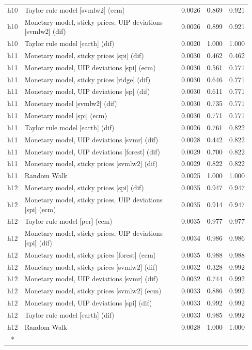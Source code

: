 \begin{ThreePartTable}
\begin{longtable}[t]{cp{5.5cm}ccc}
h10 & \raggedright Taylor rule model [svmlw2] (ecm) & 0.0026 & 0.869 & 0.921\\
h10 & \raggedright Monetary model, sticky prices, UIP deviations [svmlw2] (dif) & 0.0026 & 0.899 & 0.921\\
h10 & \raggedright Taylor rule model [earth] (dif) & 0.0020 & 1.000 & 1.000\\
\addlinespace
h11 & \raggedright Monetary model, sticky prices [spi] (dif) & 0.0030 & 0.462 & 0.462\\
h11 & \raggedright Monetary model, UIP deviations [spi] (ecm) & 0.0030 & 0.561 & 0.771\\
h11 & \raggedright Monetary model, sticky prices [ridge] (dif) & 0.0030 & 0.646 & 0.771\\
h11 & \raggedright Monetary model, UIP deviations [sp] (dif) & 0.0030 & 0.611 & 0.771\\
h11 & \raggedright Monetary model [svmlw2] (dif) & 0.0030 & 0.735 & 0.771\\
h11 & \raggedright Monetary model [spi] (ecm) & 0.0030 & 0.771 & 0.771\\
h11 & \raggedright Taylor rule model [earth] (dif) & 0.0026 & 0.761 & 0.822\\
h11 & \raggedright Monetary model, UIP deviations [svmr] (dif) & 0.0028 & 0.442 & 0.822\\
h11 & \raggedright Monetary model, UIP deviations [forest] (dif) & 0.0029 & 0.700 & 0.822\\
h11 & \raggedright Monetary model, sticky prices [svmlw2] (dif) & 0.0029 & 0.822 & 0.822\\
h11 & \raggedright Random Walk & 0.0025 & 1.000 & 1.000\\
\addlinespace
h12 & \raggedright Monetary model, sticky prices [spi] (dif) & 0.0035 & 0.947 & 0.947\\
h12 & \raggedright Monetary model, sticky prices, UIP deviations [spi] (ecm) & 0.0035 & 0.914 & 0.947\\
h12 & \raggedright Taylor rule model [pcr] (ecm) & 0.0035 & 0.977 & 0.977\\
h12 & \raggedright Monetary model, sticky prices, UIP deviations [spi] (dif) & 0.0034 & 0.986 & 0.986\\
h12 & \raggedright Monetary model, sticky prices [forest] (ecm) & 0.0035 & 0.988 & 0.988\\
h12 & \raggedright Monetary model, sticky prices [svmlw2] (dif) & 0.0032 & 0.328 & 0.992\\
h12 & \raggedright Monetary model, UIP deviations [svmr] (dif) & 0.0032 & 0.744 & 0.992\\
h12 & \raggedright Monetary model, sticky prices [svmlw2] (ecm) & 0.0033 & 0.886 & 0.992\\
h12 & \raggedright Monetary model, UIP deviations [spi] (dif) & 0.0033 & 0.992 & 0.992\\
h12 & \raggedright Taylor rule model [earth] (dif) & 0.0033 & 0.985 & 0.992\\
h12 & \raggedright Random Walk & 0.0028 & 1.000 & 1.000\\*
\end{longtable}
\end{ThreePartTable}
\endgroup{}
